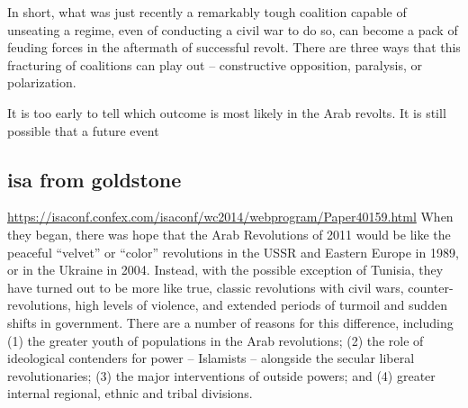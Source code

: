 In short, what was just recently a remarkably tough coalition
capable of unseating a regime, even of conducting a civil war to do so, can become a pack
of feuding forces in the aftermath of successful revolt.
There are three ways that this fracturing of coalitions can play out – constructive opposition,
paralysis, or polarization.

It is too early to tell which outcome is most likely in the Arab revolts. It is still possible
that a future event


\subsection{isa from goldstone}

\url{https://isaconf.confex.com/isaconf/wc2014/webprogram/Paper40159.html}
When they began, there was hope that the Arab Revolutions of 2011 would be like the peaceful “velvet” or “color” revolutions in the USSR and Eastern Europe in 1989, or in the Ukraine in 2004.  Instead, with the possible exception of Tunisia, they have turned out to be more like true, classic revolutions with civil wars, counter-revolutions, high levels of violence, and extended periods of turmoil and sudden shifts in government.  There are a number of reasons for this difference, including (1) the greater youth of populations in the Arab revolutions; (2) the role of ideological contenders for power – Islamists – alongside the secular liberal revolutionaries; (3) the major interventions of outside powers; and (4) greater internal regional, ethnic and tribal divisions.


\subsection{\cite{goldstone_bringing_2013}}

